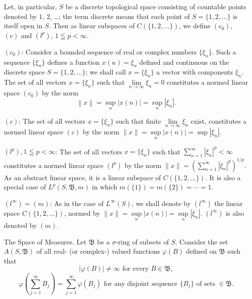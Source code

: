 \begin{example}\label{ex:I.3.Example.4} Let, in particular, $S$ be a discrete topological space consisting of countable points denoted by $1$, $2$, \ldots; the term discrete means that each point of $S = \{1, 2, \ldots\}$ is itself open in $S$. Then as linear subspaces of $C(\{1, 2, \ldots\})$, we define $(c_{0})$, $(c)$ and $(l^{p})$, $1 \leqq p< \infty$. 

$(c_{0})$: Consider a bounded sequence of real or complex numbers $\{\xi_{n}\}$. Such a sequence $\{\xi_{n}\}$ defines a function $x(n)=\xi_{n}$ defined and continuous on the discrete space $S=\{1,2,\ldots\}$; we shall call $x=\{\xi_{n}\}$ a vector with components $\xi_{n}$. The set of all vectors $x = \{\xi_{n}\}$ such that $\lim\limits_{n\to \infty}\xi_n = 0$ constitutes a normed linear space $(c_0)$ by the norm 
\[
\left\| x \right\| = \sup\limits_{n} | x (n) | = \sup\limits_{n} \left| \xi_{n} \right|.
\]
\end{example}

$(c)$: The set of all vectors $x = \{\xi_n\}$ such that finite $\lim\limits_{n \to \infty} \xi_n$ exist, constitutes a normed linear space $(c)$ by the norm $\|x\| = \sup\limits_n |x(n)| = \sup|\xi_n|$. 

$(l^{p}), 1 \leqq p< \infty$: The set of all vectors $x = \{\xi_{n}\}$ such that $\sum\limits_{n=1}^{\infty} |\xi_{n}|^{p} < \infty$ constitutes a normed linear space $(l^{p})$ by the norm $\|x\| = \left( \sum\limits_{n=1}^{\infty} |\xi_{n}|^{p} \right)^{1/p}$. As an abstract linear space, it is a linear subspace of $C(\{1, 2, \ldots\})$. It is also a special case of $L^{p}(S, \mathfrak{B}, m)$ in which $m(\{1\}) = m(\{2\}) = \cdots = 1$.

$(l^{\infty}) = (m)$: As in the case of $L^{\infty}(S)$, we shall denote by $(l^{\infty})$ the linear space $C(\{1, 2, \ldots\})$, normed by $\|x\| = \sup\limits_{n} |x(n)| = \sup\limits_{n} |\xi_n|$. $(l^{\infty})$ is also denoted by $(m)$. 

The Space of Measures. Let $\mathfrak{B}$ be a $\sigma$-ring of subsets of $S$. Consider the set $A(S, \mathfrak{B})$ of all real- (or complex-) valued functions $\varphi(B)$ defined on $\mathfrak{B}$ such that 
\begin{equation}\label{eq:I.3.7}
\left| \varphi (B) \right| \neq \infty \text{ for every } B \in \mathfrak {B},
\end{equation}
\begin{equation}\label{eq:I.3.8}
\varphi \left( \sum\limits_{j=1} ^{\infty} B_j \right) = \sum\limits_{j=1} ^{\infty} \varphi (B_j) \text{ for any disjoint sequence } \{B_j \} \text{ of sets } \in \mathfrak{B}.
\end{equation}



